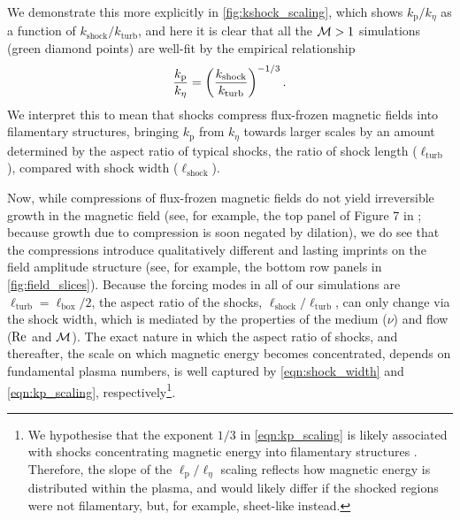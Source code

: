 We demonstrate this more explicitly in \autoref{fig:kshock_scaling}, which shows $k_\mathrm{p}/k_\eta$ as a function of $k_\mathrm{shock}/k_\mathrm{turb}$, and here it is clear that all the $\mathcal{M} > 1$ simulations (green diamond points) are well-fit by the empirical relationship
\begin{align}
    \frac{k_\mathrm{p}}{k_\eta}
        = \left( \frac{k_\mathrm{shock}}{k_\mathrm{turb}} \right)^{-1/3}
    . \label{eqn:kp_scaling}
\end{align}
We interpret this to mean that shocks compress flux-frozen magnetic fields into filamentary structures, bringing $k_\mathrm{p}$ from $k_\eta$ towards larger scales by an amount determined by the aspect ratio of typical shocks, \ie the ratio of shock length ($\ell_\mathrm{turb}$), compared with shock width ($\ell_\mathrm{shock}$).

Now, while compressions of flux-frozen magnetic fields do not yield irreversible growth in the magnetic field (see, for example, the top panel of Figure 7 in \citealt{beattie2023bulk}; because growth due to compression is soon negated by dilation), we do see that the compressions introduce qualitatively different and lasting imprints on the field amplitude structure (see, for example, the bottom row panels in \autoref{fig:field_slices}). Because the forcing modes in all of our simulations are $\ell_\mathrm{turb} = \ell_\mathrm{box}/2$, the aspect ratio of the shocks, \ie $\ell_\mathrm{shock}/\ell_\mathrm{turb}$, can only change via the shock width, which is mediated by the properties of the medium (\ie $\nu$) and flow ($\mathrm{Re}$ and $\mathcal{M}$). The exact nature in which the aspect ratio of shocks, and thereafter, the scale on which magnetic energy becomes concentrated, depends on fundamental plasma numbers, is well captured by \autoref{eqn:shock_width} and \autoref{eqn:kp_scaling}, respectively\footnote{
    We hypothesise that the exponent $1/3$ in \autoref{eqn:kp_scaling} is likely associated with shocks concentrating magnetic energy into filamentary structures \citep{das2024magnetic}. Therefore, the slope of the $\ell_\mathrm{p}/\ell_\eta$ scaling reflects how magnetic energy is distributed within the plasma, and would likely differ if the shocked regions were not filamentary, but, for example, sheet-like instead.
}.

